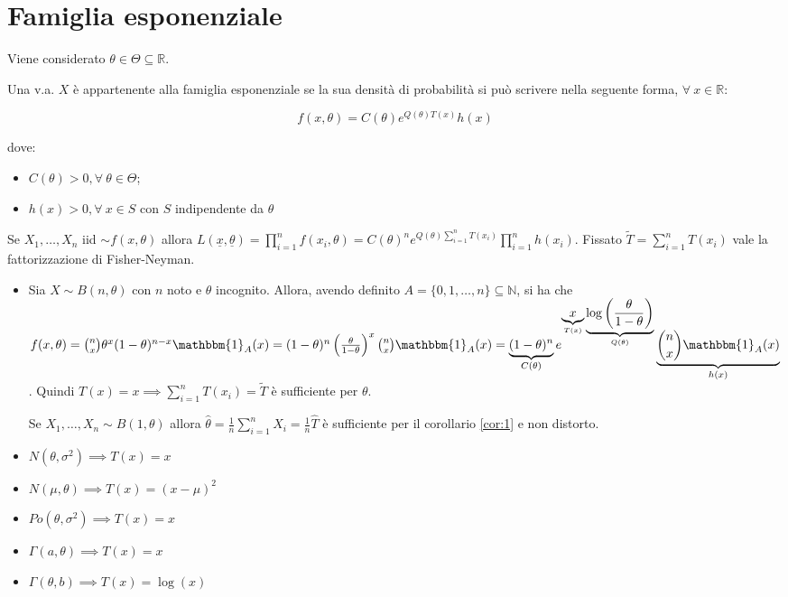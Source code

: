 \documentclass[hidelinks, 10pt]{report}
\begin{document}
\section{Famiglia esponenziale}
Viene considerato $ \theta \in \Theta \subseteq \mathbb{R} $.

\begin{defn}
Una v.a. $ X $ \`e appartenente alla famiglia esponenziale se la sua densit\`a di probabilit\`a si pu\`o scrivere nella seguente forma, $ \forall\ x \in \mathbb{R} $:

\[ f(x, \theta) = C(\theta) e^{Q(\theta) T(x)} h(x) \]

dove:
\begin{itemize}
\item $ C(\theta) > 0, \forall\ \theta \in \Theta $;
\item $ h(x) > 0, \forall\ x \in S $ con $ S $ indipendente da $ \theta $
\end{itemize}
\end{defn}

Se $ X_1, \dotsc, X_n $ iid $ \sim f(x, \theta) $ allora $ L(\underline{x}, \underline{\theta}) = \prod\limits_{i = 1}^{n} f(x_i, \theta) = C(\theta)^n e^{Q(\theta) \sum\limits_{i = 1}^{n} T(x_i)} \prod\limits_{i = 1}^{n} h(x_i) $. Fissato $ \tilde{T} = \sum\limits_{i = 1}^{n} T(x_i) $ vale la fattorizzazione di Fisher-Neyman.

\begin{es}
\begin{itemize}
\item Sia $ X \sim B(n, \theta) $ con $ n $ noto e $ \theta $ incognito. Allora, avendo definito $ A = \{ 0, 1, \dotsc, n \} \subseteq \mathbb{N} $, si ha che $ f(x, \theta) = \binom{n}{x} \theta^x (1 - \theta)^{n-x} \mathbbm{1}_{A} (x) = (1 - \theta)^n \left( \frac{\theta}{1 - \theta} \right)^x \binom{n}{x} \mathbbm{1}_A (x) = \underbrace{(1 - \theta)^n}_{C(\theta)} e^{\underbrace{x}_{T(x)} \underbrace{\log \left( \frac{\theta}{1 - \theta} \right)}_{Q(\theta)}} \underbrace{\binom{n}{x} \mathbbm{1}_A (x)}_{h(x)} $. Quindi $ T(x) = x \implies \sum\limits_{i = 1}^{n} T(x_i) = \tilde{T} $ \`e sufficiente per $ \theta $.

Se $ X_1, \dotsc, X_n \sim B (1, \theta) $ allora $ \hat{\theta} = \frac{1}{n} \sum\limits_{i = 1}^{n} X_i = \frac{1}{n} \hat{T} $ \`e sufficiente per il corollario \ref{cor:1} e non distorto.
\item $ N(\theta, \sigma^2) \implies T(x) = x $
\item $ N(\mu, \theta) \implies T(x) = (x - \mu)^2 $
\item $ Po(\theta, \sigma^2) \implies T(x) = x $
\item $ \Gamma(a, \theta) \implies T(x) = x $
\item $ \Gamma(\theta, b) \implies T(x) = \log (x) $
\end{itemize}
\end{es}
\end{document}
